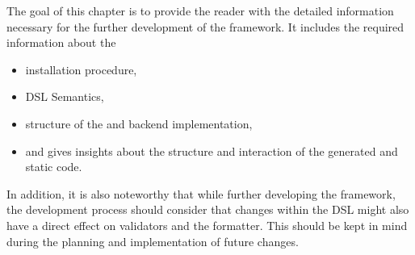

The goal of this chapter is to provide the reader with the detailed information necessary for the further development of the \MD framework. It includes the required information about the 

\begin{itemize}
	\item installation procedure,
	\item DSL Semantics,
	\item structure of the \mapapps and backend implementation,
	\item and  gives insights about the structure and interaction of the generated and static code.
\end{itemize}

In addition, it is also noteworthy that while further developing the framework, the development process should consider that changes within the DSL might also have a direct effect on validators and the formatter. This should be kept in mind during the planning and implementation of future changes.
